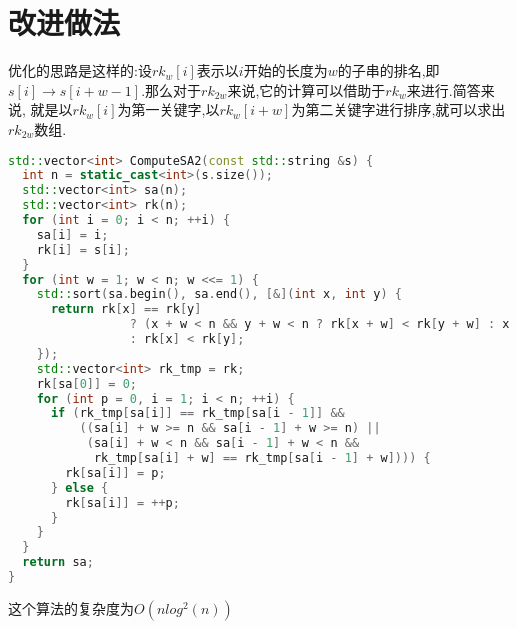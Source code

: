 \documentclass{article}
\begin{document}
\section{改进做法}
优化的思路是这样的:设$rk_{w}[i]$表示以$i$开始的长度为$w$的子串的排名,即$s[i]\rightarrow s[i+w-1]$.那么对于$rk_{2w}$来说,它的计算可以借助于$rk_{w}$来进行.简答来说, 就是以$rk_{w}[i]$为第一关键字,以$rk_{w}[i+w]$为第二关键字进行排序,就可以求出$rk_{2w}$数组.
\begin{lstlisting}[language=C++, caption={Normal}]
std::vector<int> ComputeSA2(const std::string &s) {
  int n = static_cast<int>(s.size());
  std::vector<int> sa(n);
  std::vector<int> rk(n);
  for (int i = 0; i < n; ++i) {
    sa[i] = i;
    rk[i] = s[i];
  }
  for (int w = 1; w < n; w <<= 1) {
    std::sort(sa.begin(), sa.end(), [&](int x, int y) {
      return rk[x] == rk[y]
                 ? (x + w < n && y + w < n ? rk[x + w] < rk[y + w] : x + w >= n)
                 : rk[x] < rk[y];
    });
    std::vector<int> rk_tmp = rk;
    rk[sa[0]] = 0;
    for (int p = 0, i = 1; i < n; ++i) {
      if (rk_tmp[sa[i]] == rk_tmp[sa[i - 1]] &&
          ((sa[i] + w >= n && sa[i - 1] + w >= n) ||
           (sa[i] + w < n && sa[i - 1] + w < n &&
            rk_tmp[sa[i] + w] == rk_tmp[sa[i - 1] + w]))) {
        rk[sa[i]] = p;
      } else {
        rk[sa[i]] = ++p;
      }
    }
  }
  return sa;
}
\end{lstlisting}
这个算法的复杂度为$O(nlog^{2}(n))$
\end{document}
